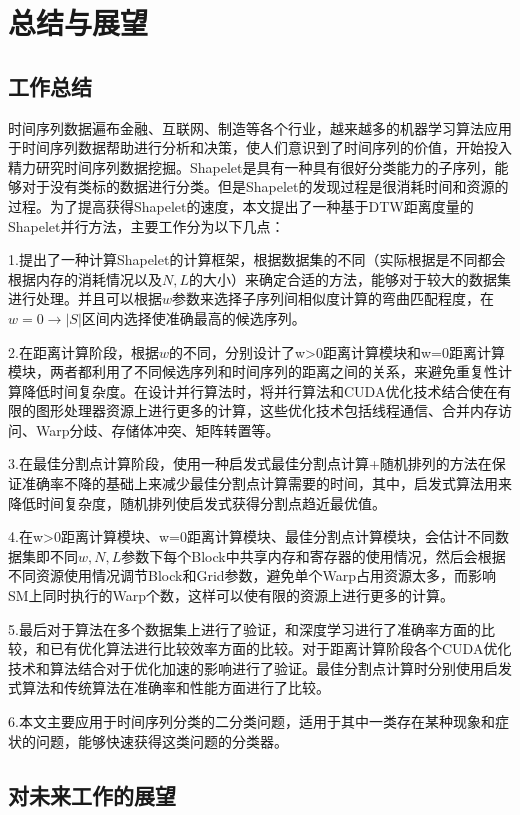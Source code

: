 \chapter{总结与展望}
\label{cha:summary}
\section{工作总结}

时间序列数据遍布金融、互联网、制造等各个行业，越来越多的机器学习算法应用于时间序列数据帮助进行分析和决策，使人们意识到了时间序列的价值，开始投入精力研究时间序列数据挖掘。Shapelet是具有一种具有很好分类能力的子序列，能够对于没有类标的数据进行分类。但是Shapelet的发现过程是很消耗时间和资源的过程。为了提高获得Shapelet的速度，本文提出了一种基于DTW距离度量的Shapelet并行方法，主要工作分为以下几点：

1.提出了一种计算Shapelet的计算框架，根据数据集的不同（实际根据是不同都会根据内存的消耗情况以及$N,L$的大小）来确定合适的方法，能够对于较大的数据集进行处理。并且可以根据$w$参数来选择子序列间相似度计算的弯曲匹配程度，在$w=0\to |S|$区间内选择使准确最高的候选序列。

2.在距离计算阶段，根据$w$的不同，分别设计了w>0距离计算模块和w=0距离计算模块，两者都利用了不同候选序列和时间序列的距离之间的关系，来避免重复性计算降低时间复杂度。在设计并行算法时，将并行算法和CUDA优化技术结合使在有限的图形处理器资源上进行更多的计算，这些优化技术包括线程通信、合并内存访问、Warp分歧、存储体冲突、矩阵转置等。

3.在最佳分割点计算阶段，使用一种启发式最佳分割点计算+随机排列的方法在保证准确率不降的基础上来减少最佳分割点计算需要的时间，其中，启发式算法用来降低时间复杂度，随机排列使启发式获得分割点趋近最优值。

4.在w>0距离计算模块、w=0距离计算模块、最佳分割点计算模块，会估计不同数据集即不同$w,N,L$参数下每个Block中共享内存和寄存器的使用情况，然后会根据不同资源使用情况调节Block和Grid参数，避免单个Warp占用资源太多，而影响SM上同时执行的Warp个数，这样可以使有限的资源上进行更多的计算。

5.最后对于算法在多个数据集上进行了验证，和深度学习进行了准确率方面的比较，和已有优化算法进行比较效率方面的比较。对于距离计算阶段各个CUDA优化技术和算法结合对于优化加速的影响进行了验证。最佳分割点计算时分别使用启发式算法和传统算法在准确率和性能方面进行了比较。

6.本文主要应用于时间序列分类的二分类问题，适用于其中一类存在某种现象和症状的问题，能够快速获得这类问题的分类器。

\section{对未来工作的展望}


